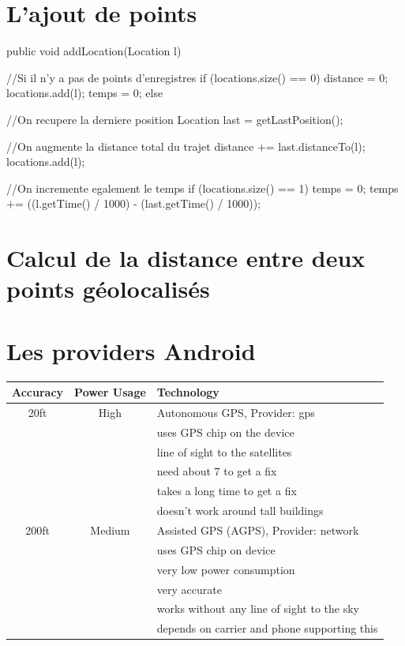 \begin{appendices}
\chapter{L'ajout de points}

\label{Annexe1}
\begin{java}  
public void addLocation(Location l) {
	//Si il n'y a pas de points d'enregistres
	if (locations.size() == 0) {
		distance = 0;
		locations.add(l);
		temps = 0;
	} else {
	
	//On recupere la derniere position 
	Location last = getLastPosition();
	
	//On augmente la distance total du trajet 
	distance += last.distanceTo(l);
	locations.add(l);
 	
 	//On incremente egalement le temps 
	if (locations.size() == 1) {
		temps = 0;
	} 
	temps += ((l.getTime() / 1000) - (last.getTime() / 1000));   
	}
}
\end{java}

\chapter{Calcul de la distance entre deux points géolocalisés}
\label{Annexe2}

\chapter{Les providers Android}
\label{Annexe3}
\begin{center}
   \begin{tabular}{| c | c | l | }
     \hline
     Accuracy & Power Usage & Technology \\ \hline
     20ft & High & Autonomous GPS, Provider: gps \\ 
     && uses GPS chip on the device \\
     && line of sight to the satellites \\
     && need about 7 to get a fix \\
     && takes a long time to get a fix \\
     && doesn’t work around tall buildings \\ \hline
 
     200ft & Medium & Assisted GPS (AGPS), Provider: network \\ 
     && uses GPS chip on device \\
	 && very low power consumption \\
	 && very accurate \\
	 && works without any line of sight to the sky \\
	 && depends on carrier and phone supporting this \\ \hline
    

\end{tabular}
\end{center}
\end{appendices}
